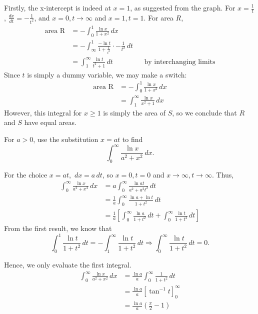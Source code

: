 \documentclass[../main.tex]{subfiles}
\begin{document}
Firstly, the x-intercept is indeed at $x=1$, as suggested from the graph. For  $x=\frac{1}{t}$, $\frac{dx}{dt}=-\frac{1}{t^2}$, and $x=0, t\to \infty$ and $x=1, t=1$. For area $R$, 
\begin{align*}
    \text{area R} &= -\int_0^{1}\frac{\ln{x}}{1+x^2}\,dx \\
    &=-\int_{\infty}^{1}\frac{-\ln{t}}{1+\frac{1}{t^2}} \cdot -\frac{1}{t^2}\,dt\\
    &=\int_{1}^{\infty}\frac{\ln{t}}{t^2+1} \,dt &&\text{by interchanging limits}
\end{align*}
Since $t$ is simply a dummy variable, we may make a switch:
\begin{align*}
    \text{area R} &= -\int_0^{1}\frac{\ln{x}}{1+x^2}\,dx \\
    &=\int_{1}^{\infty}\frac{\ln{x}}{x^2+1} \,dx
\end{align*}
However, this integral for $x\geq 1$ is simply the area of $S$, so we conclude that $R$ and $S$ have equal areas.

\begin{example}[cont.]\label{0.2-subst}
For $a > 0$, use the substitution $x=at$ to find $$\int_{0}^{\infty}\frac{\ln{x}}{a^2+x^2} \,dx.$$
\end{example}
For the choice $x=at$, $\,dx=a\,dt$, so $x=0,t=0$ and $x \to \infty, t\to\infty$.
Thus,
\begin{align*}
    \int_{0}^{\infty}\frac{\ln{x}}{a^2+x^2} \,dx &= a\int_{0}^{\infty}\frac{\ln{at}}{a^2+a^2t^2} \,dt \\
    &= \frac{1}{a}\int_{0}^{\infty}\frac{\ln{a}+\ln{t}}{1+t^2} \,dt \\
    &= \frac{1}{a}\left[\int_{0}^{\infty}\frac{\ln{a}}{1+t^2}\,dt+\int_{0}^{\infty}\frac{\ln{t}}{1+t^2} \,dt\right]
\end{align*}
From the first result, we know that $$\int_{0}^{1}\frac{\ln{t}}{1+t^2} \,dt=-\int_{1}^{\infty}\frac{\ln{t}}{1+t^2} \,dt \Longrightarrow \int_{0}^{\infty}\frac{\ln{t}}{1+t^2} \,dt=0.$$

Hence, we only evaluate the first integral.
\begin{align*}
    \int_{0}^{\infty}\frac{\ln{x}}{a^2+x^2} \,dx
    &= \frac{\ln{a}}{a}\int_{0}^{\infty}\frac{1}{1+t^2}\,dt \\
    &= \frac{\ln{a}}{a}\left[\tan^{-1}{t}\right]_{0}^{\infty} \\
    &= \frac{\ln{a}}{a}\left(\frac{\pi}{2}-1\right)
\end{align*}
\end{document}
